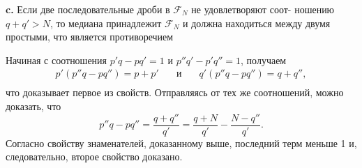 \pagebreak

\textbf{c.} Если две последовательные дроби в $\mathcal{F}_N$ не удовлетворяют соот-­\linebreak
ношению $q + q' > N$, то медиана принадлежит $\mathcal{F}_N$ и должна находиться\linebreak
между двумя простыми, что является противоречием

Начиная с соотношения $p'q - pq' = 1$ и $p''q' - p'q'' = 1$,  получаем
		$$\begin{array}{cccc}
				p'(p''q - pq'') = p + p' & \quad\text{и}\quad & q'(p{''}q - pq{''}) = q + q'',\\
		\end{array}$$
что доказывает первое из свойств. Отправляясь от тех же соотношений,\linebreak
можно доказать, что 
$$p''q - pq'' = \frac{q + q''}{q'} = \frac{q + N}{q'} - \frac{N - q''}{q'}.$$
\noindent Согласно свойству знаменателей, доказанному выше, последний терм\linebreak
меньше 1 и, следовательно, второе свойство доказано.

